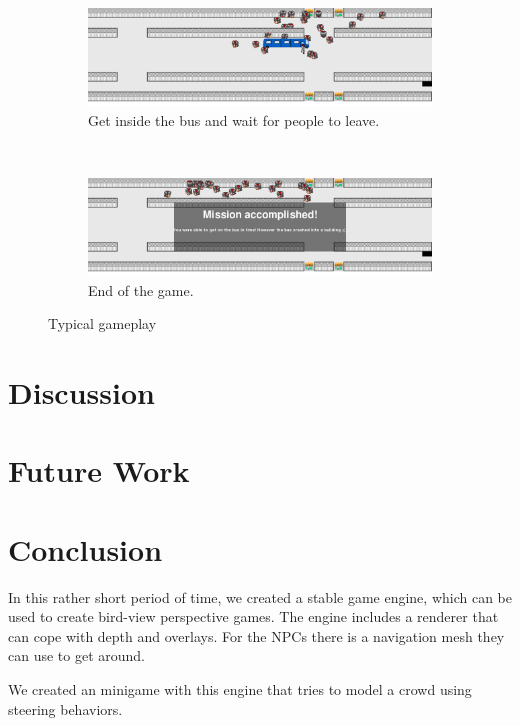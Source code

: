 \documentclass[a4paper,pdf,12pt]{article}
\begin{document}
\begin{figure}
        \begin{subfigure}[b]{0.4\textwidth}
                \centering
                \includegraphics[width=\textwidth]{../screenshots/screenshot_31108.png}
                \caption{Get inside the bus and wait for people to leave.}
                \label{fig:screenshot05}
        \end{subfigure}
        ~ %
        \begin{subfigure}[b]{0.4\textwidth}
                \centering
                \includegraphics[width=\textwidth]{../screenshots/screenshot_62502.png}
                \caption{End of the game.}
                \label{fig:screenshot06}
        \end{subfigure}

        \caption{Typical gameplay}\label{fig:gameplay}
\end{figure}

\section{Discussion}
\label{sec:Discussion}

\section{Future Work}
\label{sec:Future Work}

\section{Conclusion}
\label{sec:Conclusion}

In this rather short period of time, we created a stable game engine, which can be used to create bird-view perspective games. The engine includes a renderer that can cope with depth and overlays. For the NPCs there is a navigation mesh they can use to get around. 

We created an minigame with this engine that tries to model a crowd using steering behaviors.



\end{document}
